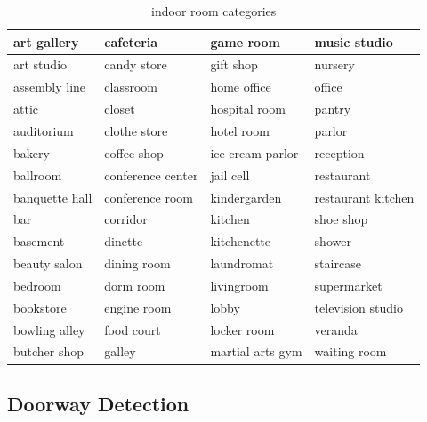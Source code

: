 \begin{table}
\caption{indoor room categories}
\begin{tabular}{|l|l|l|l|} \hline
art gallery &  cafeteria &  game room &  music studio \\ \hline
art studio &  candy store &  gift shop &  nursery \\ \hline
assembly line &  classroom &  home office &  office \\ \hline
attic &  closet &  hospital room &  pantry \\ \hline
auditorium &  clothe store &  hotel room &  parlor \\ \hline
bakery &  coffee shop &  ice cream parlor &  reception \\ \hline
ballroom &  conference center &  jail cell &  restaurant \\ \hline
banquette hall &  conference room &  kindergarden &  restaurant kitchen \\ \hline
bar &  corridor &  kitchen &  shoe shop \\ \hline
basement &  dinette &  kitchenette &  shower \\ \hline
beauty salon &  dining room &  laundromat &  staircase \\ \hline
bedroom &  dorm room &  livingroom &  supermarket \\ \hline
bookstore &  engine room &  lobby &  television studio \\ \hline
bowling alley &  food court &  locker room &  veranda \\ \hline
butcher shop &  galley &  martial arts gym &  waiting room \\ \hline
\end{tabular}
\label{room types}
\end{table}

\subsection{Doorway Detection} \label{DoorwayDetection}

